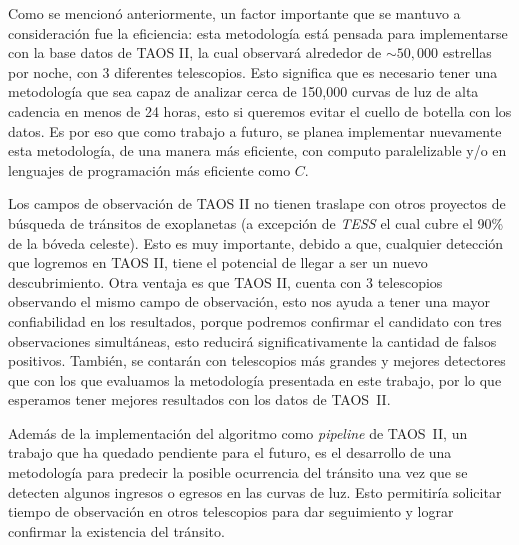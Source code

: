 Como se mencionó anteriormente, un factor importante que se mantuvo a consideración fue la eficiencia: esta metodología está pensada para implementarse con la base datos de TAOS II, la cual observará alrededor de $\sim 50,000$ estrellas por noche, con 3 diferentes telescopios. Esto significa que es necesario tener una metodología que sea capaz de analizar cerca de 150,000 curvas de luz de alta cadencia en menos de 24 horas, esto si queremos evitar el cuello de botella con los datos. Es por eso que como trabajo a futuro, se planea implementar nuevamente esta metodología, de una manera más eficiente, con computo paralelizable y/o en lenguajes de programación más eficiente como $C$.

Los campos de observación de TAOS II no tienen traslape con otros proyectos de búsqueda de tránsitos de exoplanetas (a excepción de \textit{TESS} el cual cubre el 90\% de la bóveda celeste). Esto es muy importante, debido a que, cualquier detección que logremos en TAOS II, tiene el potencial de llegar a ser un nuevo descubrimiento. Otra ventaja es que TAOS II, cuenta con 3 telescopios observando el mismo campo de observación, esto nos ayuda a tener una mayor confiabilidad en los resultados, porque podremos confirmar el candidato con tres observaciones simultáneas, esto reducirá significativamente la cantidad de falsos positivos. También, se contarán con telescopios más grandes y mejores detectores que con los que evaluamos la metodología presentada en este trabajo, por lo que esperamos tener mejores resultados con los datos de TAOS~II.

Además de la implementación del algoritmo como \textit{pipeline} de TAOS~II, un trabajo que ha quedado pendiente para el futuro, es el desarrollo de una metodología para predecir la posible ocurrencia del tránsito una vez que se detecten algunos ingresos o egresos en las curvas de luz. Esto permitiría solicitar tiempo de observación en otros telescopios para dar seguimiento y lograr confirmar la existencia del tránsito.



